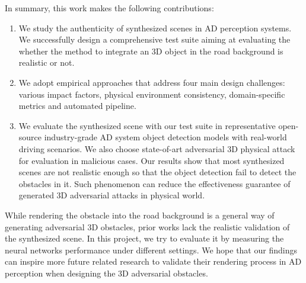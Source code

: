 In summary, this work makes the following contributions:
\begin{enumerate}
	\item We study the authenticity of synthesized scenes in AD perception systems. 
	We successfully design a comprehensive test suite aiming at evaluating the whether the method to integrate an 3D object in the road background is realistic or not.
	\item We adopt empirical approaches that address four main design challenges: 
	various impact factors, physical environment consistency, domain-specific metrics and automated pipeline.
	\item We evaluate the synthesized scene with our test suite in representative open-source industry-grade AD system object detection models with real-world driving scenarios.
	We also choose state-of-art adversarial 3D physical attack for evaluation in malicious cases.
	Our results show that most synthesized scenes are not realistic enough so that the object detection fail to detect the obstacles in it.
	Such phenomenon can reduce the effectiveness guarantee of generated 3D adversarial attacks in physical world.
\end{enumerate}

While rendering the obstacle into the road background is a general way of generating adversarial 3D obstacles, 
prior works lack the realistic validation of the synthesized scene. 
In this project, we try to evaluate it by measuring the neural networks performance under different settings.
We hope that our findings can inspire more future related research to validate their rendering process in AD perception when designing the 3D adversarial obstacles.


